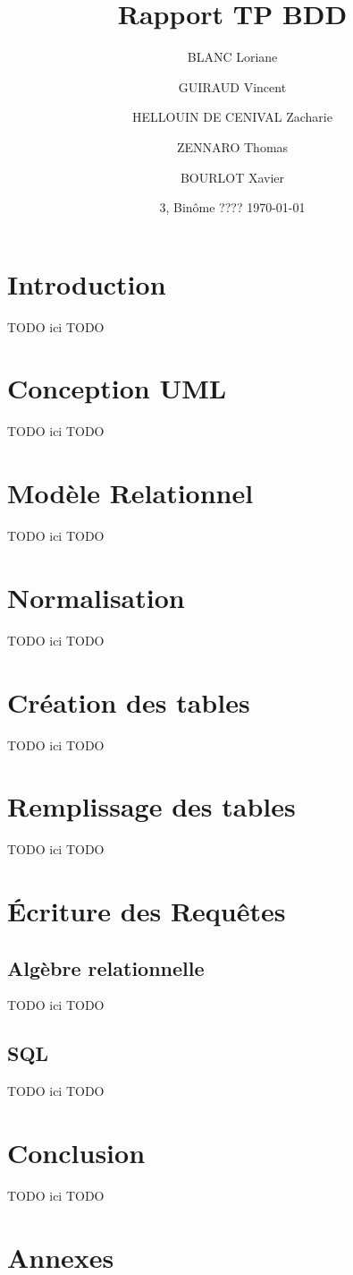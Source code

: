 \documentclass[french]{article}
\title{Rapport TP BDD}
\author{ BLANC Loriane \and GUIRAUD Vincent \and HELLOUIN DE CENIVAL Zacharie \and ZENNARO Thomas \and  BOURLOT Xavier}
\date{3\bsc{Imacs-ae-c}, Binôme ???? \bigbreak \today}
\begin{document}
\maketitle

\tableofcontents

\newpage

\section{Introduction}
TODO ici TODO
\section{Conception UML}
TODO ici TODO
\section{Modèle Relationnel}
TODO ici TODO
\section{Normalisation}
TODO ici TODO
\section{Création des tables}
TODO ici TODO
\section{Remplissage des tables}
TODO ici TODO
\section{Écriture des Requêtes}
\subsection{Algèbre relationnelle}
TODO ici TODO
\subsection{SQL}
TODO ici TODO

\begin{figure}
 
\caption{}
\end{figure} 

\section{Conclusion}
TODO ici TODO

\newpage
\appendix
\section{Annexes}
\end{document}
